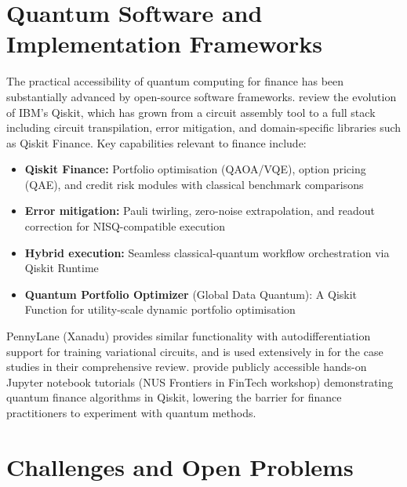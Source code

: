 \documentclass[12pt,a4paper]{article}
\begin{document}
\section{Quantum Software and Implementation Frameworks}
\label{sec:software}

The practical accessibility of quantum computing for finance has been substantially advanced by open-source software frameworks. \citet{pathak_evolution_2025} review the evolution of IBM's Qiskit, which has grown from a circuit assembly tool to a full stack including circuit transpilation, error mitigation, and domain-specific libraries such as Qiskit Finance. Key capabilities relevant to finance include:
\begin{itemize}[noitemsep]
    \item \textbf{Qiskit Finance:} Portfolio optimisation (QAOA/VQE), option pricing (QAE), and credit risk modules with classical benchmark comparisons
    \item \textbf{Error mitigation:} Pauli twirling, zero-noise extrapolation, and readout correction for NISQ-compatible execution
    \item \textbf{Hybrid execution:} Seamless classical-quantum workflow orchestration via Qiskit Runtime
    \item \textbf{Quantum Portfolio Optimizer} (Global Data Quantum): A Qiskit Function for utility-scale dynamic portfolio optimisation \citep{noauthor_quantum_nodate-1}
\end{itemize}

PennyLane (Xanadu) provides similar functionality with autodifferentiation support for training variational circuits, and is used extensively in \citet{gong_quantum_2026-1} for the case studies in their comprehensive review. \citet{huang_nus-frontiers--fintech-and-quantum-computing-2022part_nodate} provide publicly accessible hands-on Jupyter notebook tutorials (NUS Frontiers in FinTech workshop) demonstrating quantum finance algorithms in Qiskit, lowering the barrier for finance practitioners to experiment with quantum methods.

\section{Challenges and Open Problems}
\label{sec:challenges}
\end{document}
